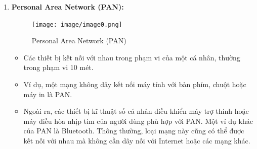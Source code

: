 \documentclass[13pt]{article}
\begin{document}
\begin{enumerate}

    \item \textbf{Personal Area Network (PAN):}
    \begin{figure}[h!]
        \centering
        \texttt{[image: image/image0.png]}
            \caption{Personal Area Network (PAN)}
            \label{fig:label1}
    \end{figure}

    \begin{itemize}
        \item Các thiết bị kết nối với nhau trong phạm vi của một cá nhân, thường trong phạm vi 10 mét.
        \item Ví dụ, một mạng không dây kết nối máy tính với bàn phím, chuột hoặc máy in là PAN.
        \item Ngoài ra, các thiết bị kĩ thuật số cá nhân điều khiển máy trợ thính hoặc máy điều hòa nhịp tim của người dùng phù hợp với PAN. Một ví dụ khác của PAN là Bluetooth. Thông thường, loại mạng này cũng có thể được kết nối với nhau mà không cần dây nối với Internet hoặc các mạng khác.
    \end{itemize}
    

\end{enumerate}
\end{document}
